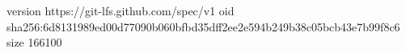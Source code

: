 version https://git-lfs.github.com/spec/v1
oid sha256:6d8131989ed00d77090b060bfbd35dff2ee2e594b249b38c05bcb43e7b99f8c6
size 166100
